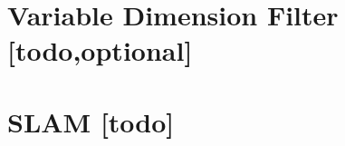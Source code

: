 \begin{comment}
------------------------------------------------------------------------------------------
- \cite{kurth2003experimental}
	- Additionally, we will extend the batch method to produce a variable dimension lter, as used by Deans for the case of bearing-only sensors [3], which would consider some window of previous robot states and optimize the position estimates based on the data in that window.
\end{comment}
\section{Variable Dimension Filter [todo,optional]}


\begin{comment}
------------------------------------------------------------------------------------------
Embodied Localisation and Mapping
http://elib.suub.uni-bremen.de/edocs/00103537-1.pdf

- \cite{sarkka2013bayesian}
	- Bayesian filtering and smoothing
- \cite{kurth2003experimental}
	- The Kalman lter approach described in Section 5 can be reformulated for the SLAM problem. To perform SLAM, we include position estimates for each tag in the state, producing a state vector of the form: q(k) = [xk; yk; k; xb1; yb1 ; :::; xbn; ybn]T , where n is the number of beacons.
\end{comment}
\section{SLAM [todo]}



